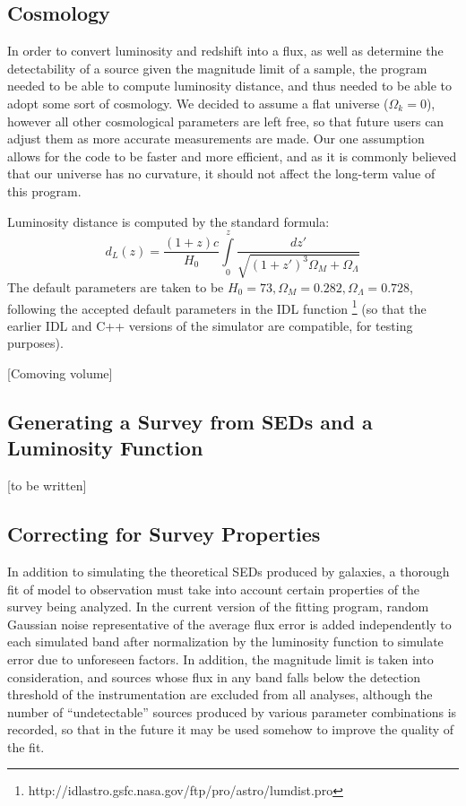 \documentclass[twocolumn,letterpaper,10pt]{article}
\begin{document}
\subsection{Cosmology}

In order to convert luminosity and redshift into a flux, as well as determine the detectability of a source given the magnitude limit of a sample, the program needed to be able to compute luminosity distance, and thus needed to be able to adopt some sort of cosmology. We decided to assume a flat universe ($\Omega_k=0$), however all other cosmological parameters are left free, so that future users can adjust them as more accurate measurements are made. Our one assumption allows for the code to be faster and more efficient, and as it is commonly believed that our universe has no curvature, it should not affect the long-term value of this program.

Luminosity distance is computed by the standard formula:
$$
d_L(z)=\frac{(1+z)c}{H_0}\int\limits_0^z\frac{dz'}{\sqrt{(1+z')^3\Omega_M+\Omega_\Lambda}}
$$
The default parameters are taken to be $H_0=73,\Omega_M=0.282,\Omega_\Lambda=0.728$, following the accepted default parameters in the IDL function {}\footnote{http://idlastro.gsfc.nasa.gov/ftp/pro/astro/lumdist.pro} (so that the earlier IDL and C++ versions of the simulator are compatible, for testing purposes).

[Comoving volume]

\subsection{Generating a Survey from SEDs and a Luminosity Function}\label{generate}

[to be written]

\subsection{Correcting for Survey Properties}

In addition to simulating the theoretical SEDs produced by galaxies, a thorough fit of model to observation must take into account certain properties of the survey being analyzed. In the current version of the fitting program, random Gaussian noise representative of the average flux error is added independently to each simulated band after normalization by the luminosity function to simulate error due to unforeseen factors. In addition, the magnitude limit is taken into consideration, and sources whose flux in any band falls below the detection threshold of the instrumentation are excluded from all analyses, although the number of ``undetectable'' sources produced by various parameter combinations is recorded, so that in the future it may be used somehow to improve the quality of the fit. 
\end{document}
